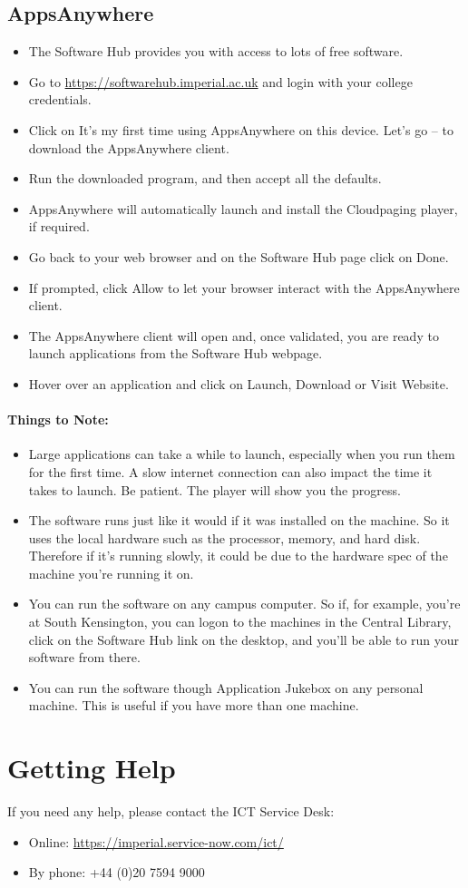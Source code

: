 \documentclass[11pt]{article}
\begin{document}
\subsection{AppsAnywhere} 
\begin{itemize}
  \item The Software Hub provides you with access to lots of free software.
  \item Go to \url{https://softwarehub.imperial.ac.uk} and login with your college credentials.
  \item Click on It’s my first time using AppsAnywhere on this device. Let’s go – to download the AppsAnywhere client.
  \item Run the downloaded program, and then accept all the defaults.
  \item AppsAnywhere will automatically launch and install the Cloudpaging player, if required.
  \item Go back to your web browser and on the Software Hub page click on Done.
  \item If prompted, click Allow to let your browser interact with the AppsAnywhere client.
  \item The AppsAnywhere client will open and, once validated, you are ready to launch applications from the Software Hub webpage.
  \item Hover over an application and click on Launch, Download or Visit Website.
\end{itemize}

\paragraph*{Things to Note:}
\begin{itemize}
  \item Large applications can take a while to launch, especially when you run them for the first time. A slow internet connection can also impact the time it takes to launch. Be patient. The player will show you the progress.
  \item The software runs just like it would if it was installed on the machine. So it uses the local hardware such as the processor, memory, and hard disk. Therefore if it’s running slowly, it could be due to the hardware spec of the machine you’re running it on.
  \item You can run the software on any campus computer. So if, for example, you’re at South Kensington, you can logon to the machines in the Central Library, click on the Software Hub link on the desktop, and you’ll be able to run your software from there.
  \item You can run the software though Application Jukebox on any personal machine. This is useful if you have more than one machine. 
\end{itemize}


\section{Getting Help}

If you need any help, please contact the ICT Service Desk:
\begin{itemize}
  \item Online:     \url{https://imperial.service-now.com/ict/}
  \item By phone:   +44 (0)20 7594 9000
\end{itemize}
\end{document}

